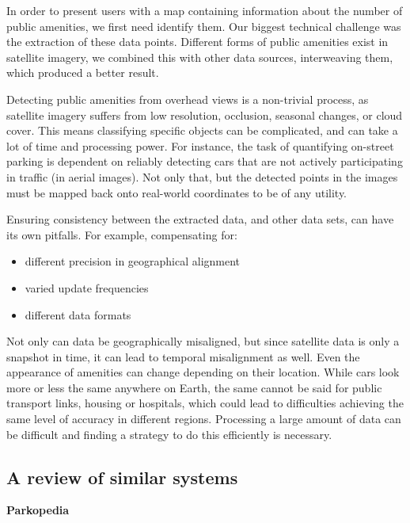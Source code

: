 In order to present users with a map containing information about the
number of public amenities, we first need identify them. Our biggest technical
challenge was the extraction of these data points. Different forms of public
amenities exist in satellite imagery, we combined this with other data
sources, interweaving them, which produced a better result.

Detecting public amenities from overhead views is a non-trivial process,
as satellite imagery suffers from low resolution, occlusion, seasonal changes, or
cloud cover. This means classifying specific objects can be complicated, and can
take a lot of time and processing power. For instance, the task of quantifying
on-street parking is dependent on reliably detecting cars that are not actively
participating in traffic (in aerial images). Not only that, but the detected
points in the images must be mapped back onto real-world coordinates to be of
any utility.

Ensuring consistency between the extracted data, and other data sets,
can have its own pitfalls. For example, compensating for:

\vspace{-3mm}
\begin{itemize}
  \item{different precision in geographical alignment}
  \item{varied update frequencies}
  \item{different data formats}
\end{itemize}
\vspace{-3mm}

Not only can data be geographically misaligned, but since satellite
data is only a snapshot in time, it can lead to temporal misalignment as well.
Even the appearance of amenities can change depending on their location. While
cars look more or less the same anywhere on Earth, the same cannot be said for
public transport links, housing or hospitals, which could lead to difficulties
achieving the same level of accuracy in different regions. Processing a large
amount of data can be difficult and finding a strategy to do this
efficiently is necessary.

\newpage{}

\subsection{A review of similar systems}

\textbf{Parkopedia}

